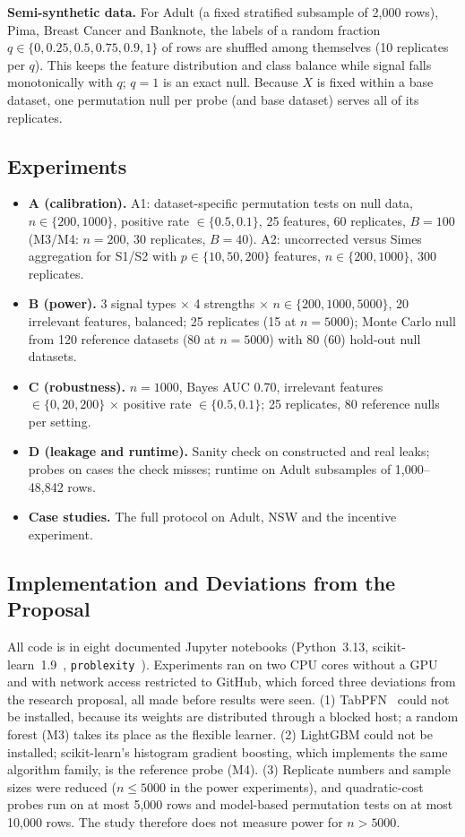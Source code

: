 \textbf{Semi-synthetic data.} For Adult (a fixed stratified subsample of 2{,}000 rows), Pima, Breast Cancer and Banknote, the labels of a random fraction $q\in\{0,0.25,0.5,0.75,0.9,1\}$ of rows are shuffled among themselves (10 replicates per $q$). This keeps the feature distribution and class balance while signal falls monotonically with $q$; $q=1$ is an exact null. Because $X$ is fixed within a base dataset, one permutation null per probe (and base dataset) serves all of its replicates.

\subsection{Experiments}

\begin{itemize}
\item \textbf{A (calibration).} A1: dataset-specific permutation tests on null data, $n\in\{200,1000\}$, positive rate $\in\{0.5,0.1\}$, 25 features, 60 replicates, $B=100$ (M3/M4: $n=200$, 30 replicates, $B=40$). A2: uncorrected versus Simes aggregation for S1/S2 with $p\in\{10,50,200\}$ features, $n\in\{200,1000\}$, 300 replicates.
\item \textbf{B (power).} 3 signal types $\times$ 4 strengths $\times$ $n\in\{200,1000,5000\}$, 20 irrelevant features, balanced; 25 replicates (15 at $n=5000$); Monte Carlo null from 120 reference datasets (80 at $n=5000$) with 80 (60) hold-out null datasets.
\item \textbf{C (robustness).} $n=1000$, Bayes AUC 0.70, irrelevant features $\in\{0,20,200\}$ $\times$ positive rate $\in\{0.5,0.1\}$; 25 replicates, 80 reference nulls per setting.
\item \textbf{D (leakage and runtime).} Sanity check on constructed and real leaks; probes on cases the check misses; runtime on Adult subsamples of 1{,}000--48{,}842 rows.
\item \textbf{Case studies.} The full protocol on Adult, NSW and the incentive experiment.
\end{itemize}

\subsection{Implementation and Deviations from the Proposal}

All code is in eight documented Jupyter notebooks (Python~3.13, scikit-learn~1.9~\cite{pedregosa2011}, \texttt{problexity}~\cite{komorniczak2022}). Experiments ran on two CPU cores without a GPU and with network access restricted to GitHub, which forced three deviations from the research proposal, all made before results were seen. (1) TabPFN~\cite{hollmann2025} could not be installed, because its weights are distributed through a blocked host; a random forest (M3) takes its place as the flexible learner. (2) LightGBM could not be installed; scikit-learn's histogram gradient boosting, which implements the same algorithm family, is the reference probe (M4). (3) Replicate numbers and sample sizes were reduced ($n\le5000$ in the power experiments), and quadratic-cost probes run on at most 5{,}000 rows and model-based permutation tests on at most 10{,}000 rows. The study therefore does not measure power for $n>5000$.
